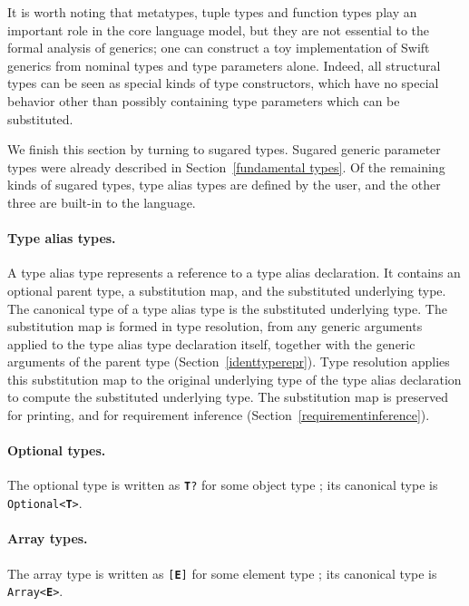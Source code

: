 \documentclass[../generics]{subfiles}
\begin{document}
\medskip

It is worth noting that metatypes, tuple types and function types play an important role in the core language model, but they are not essential to the formal analysis of generics; one can construct a toy implementation of Swift generics from nominal types and type parameters alone. Indeed, all structural types can be seen as special kinds of type constructors, which have no special behavior other than possibly containing type parameters which can be substituted.

\medskip

We finish this section by turning to sugared types. Sugared generic parameter types were already described in Section~\ref{fundamental types}. Of the remaining kinds of sugared types, type alias types are defined by the user, and the other three are built-in to the language.

\paragraph{Type alias types.} A type alias type represents a reference to a type alias declaration. It contains an optional parent type, a substitution map, and the substituted underlying type. The canonical type of a type alias type is the substituted underlying type. The substitution map is formed in type resolution, from any generic arguments applied to the type alias type declaration itself, together with the generic arguments of the parent type (Section~\ref{identtyperepr}). Type resolution applies this substitution map to the original underlying type of the type alias declaration to compute the substituted underlying type. The substitution map is preserved for printing, and for requirement inference (Section~\ref{requirementinference}).

\paragraph{Optional types.} The optional type is written as \texttt{\textbf{T}?} for some object type \T; its canonical type is \texttt{Optional<\textbf{T}>}.

\paragraph{Array types.} The array type is written as \texttt{[\textbf{E}]} for some element type ; its canonical type is \texttt{Array<\textbf{E}>}.
\end{document}
